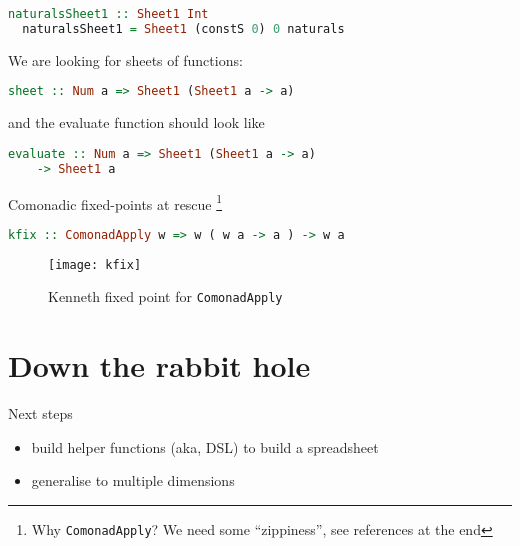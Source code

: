 \documentclass[10pt]{beamer}
\begin{document}
\begin{frame}[fragile]
  \begin{lstlisting}[language=haskell, basicstyle=\ttfamily]
  naturalsSheet1 :: Sheet1 Int
  naturalsSheet1 = Sheet1 (constS 0) 0 naturals
  \end{lstlisting}
\end{frame}

\begin{frame}[fragile]
  We are looking for sheets of functions:
  \begin{lstlisting}[language=haskell, basicstyle=\ttfamily]
  sheet :: Num a => Sheet1 (Sheet1 a -> a)
  \end{lstlisting}
  and the evaluate function should look like 
  \begin{lstlisting}[language=haskell, basicstyle=\ttfamily]
  evaluate :: Num a => Sheet1 (Sheet1 a -> a) 
    -> Sheet1 a 
  \end{lstlisting}
\end{frame}

\begin{frame}[fragile]
  Comonadic fixed-points at rescue%
  \footnote{Why \texttt{ComonadApply}? We need some ``zippiness'', see references at the end}
  \begin{lstlisting}[language=haskell, basicstyle=\ttfamily]
  kfix :: ComonadApply w => w ( w a -> a ) -> w a 
  \end{lstlisting}

\end{frame}
\begin{frame}[fragile]
  \begin{figure}
    \centering
    \texttt{[image: kfix]}
    \caption{Kenneth fixed point for \texttt{ComonadApply}}
  \end{figure}
\end{frame}

\section{Down the rabbit hole}


\begin{frame}[fragile]
  Next steps
  \begin{itemize}
    \item build helper functions (aka, DSL) to build a spreadsheet
    \item generalise to multiple dimensions 
  \end{itemize}
\end{frame}
\end{document}
